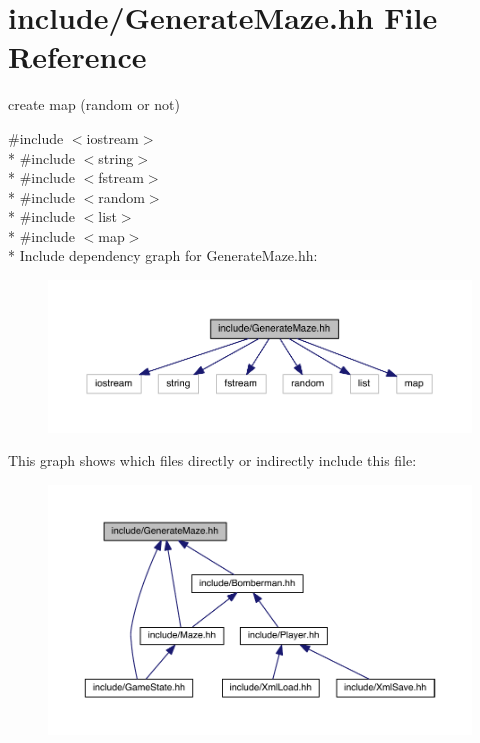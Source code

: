 \hypertarget{_generate_maze_8hh}{}\section{include/\+Generate\+Maze.hh File Reference}
\label{_generate_maze_8hh}


create map (random or not)  


{\ttfamily \#include $<$iostream$>$}\\*
{\ttfamily \#include $<$string$>$}\\*
{\ttfamily \#include $<$fstream$>$}\\*
{\ttfamily \#include $<$random$>$}\\*
{\ttfamily \#include $<$list$>$}\\*
{\ttfamily \#include $<$map$>$}\\*
Include dependency graph for Generate\+Maze.\+hh\+:\nopagebreak
\begin{figure}[H]
\begin{center}
\leavevmode
\includegraphics[width=350pt]{_generate_maze_8hh__incl}
\end{center}
\end{figure}
This graph shows which files directly or indirectly include this file\+:
\nopagebreak
\begin{figure}[H]
\begin{center}
\leavevmode
\includegraphics[width=350pt]{_generate_maze_8hh__dep__incl}
\end{center}
\end{figure}

